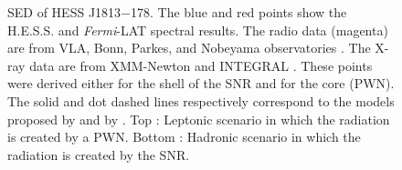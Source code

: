 \begin{figure}[h!]
\centering
{}
\caption{SED of HESS J1813$-$178. The blue and red points show the H.E.S.S. \citep{2006ApJ...636..777A} and \emph{Fermi}-LAT spectral results. The radio data (magenta) are from VLA, Bonn, Parkes, and Nobeyama observatories \citep{2005ApJ...629L.105B}. The X-ray data are from XMM-Newton \citep{2007AA...470..249F}
and INTEGRAL \citep{2005ApJ...629L.109U}. These points were derived either for the shell of the SNR and for the core (PWN). The solid and dot dashed lines respectively correspond to the models proposed by \cite{2007AA...470..249F} and by \cite{2010ApJ...718..467F}. Top : Leptonic scenario in which the radiation is created by a PWN.  Bottom : Hadronic scenario in which the radiation is created by the SNR. 
\label{fig:hessj1813}}
\end{figure}




\clearpage

